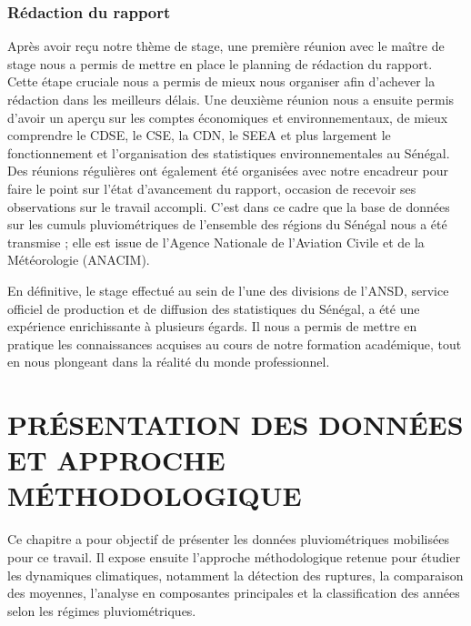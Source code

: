 \documentclass[12pt,a4paper]{report}
\begin{document}
\subsection{Rédaction du rapport}

Après avoir reçu notre thème de stage, une première réunion avec le maître de stage nous a permis de mettre en place le planning de rédaction du rapport. Cette étape cruciale nous a permis de mieux nous organiser afin d'achever la rédaction dans les meilleurs délais. Une deuxième réunion nous a ensuite permis d'avoir un aperçu sur les comptes économiques et environnementaux, de mieux comprendre le CDSE, le CSE, la CDN, le SEEA et plus largement le fonctionnement et l'organisation des statistiques environnementales au Sénégal. Des réunions régulières ont également été organisées avec notre encadreur pour faire le point sur l'état d'avancement du rapport, occasion de recevoir ses observations sur le travail accompli. C'est dans ce cadre que la base de données sur les cumuls pluviométriques de l'ensemble des régions du Sénégal nous a été transmise ; elle est issue de l'Agence Nationale de l'Aviation Civile et de la Météorologie (ANACIM).

En définitive, le stage effectué au sein de l'une des divisions de l'ANSD, service officiel de production et de diffusion des statistiques du Sénégal, a été une expérience enrichissante à plusieurs égards. Il nous a permis de mettre en pratique les connaissances acquises au cours de notre formation académique, tout en nous plongeant dans la réalité du monde professionnel.


\chapter{PRÉSENTATION DES DONNÉES ET APPROCHE MÉTHODOLOGIQUE}

\begin{chapterintro}
\begin{justify}
Ce chapitre a pour objectif de présenter les données pluviométriques mobilisées pour ce travail. Il expose ensuite l'approche méthodologique retenue pour étudier les dynamiques climatiques, notamment la détection des ruptures, la comparaison des moyennes, l'analyse en composantes principales et la classification des années selon les régimes pluviométriques.
\end{justify}
\end{chapterintro}
\end{document}
